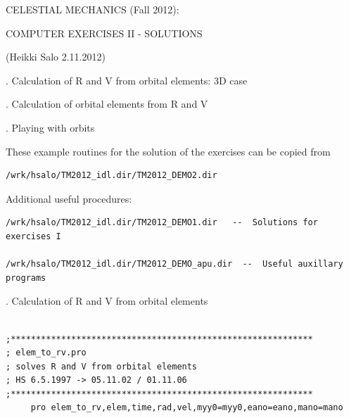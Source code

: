 \documentclass[a4paper,12pt]{article}
\def\red{\color{red}}
\def\black{\color{RGBblack}}
\begin{document}
{\centerline{}




{\norm
\vskip 0cm
{{\centerline { {\isob CELESTIAL MECHANICS (Fall 2012): }}}}
\vskip 0.2cm
{{\centerline { {\isob COMPUTER EXERCISES II - SOLUTIONS}}}}

{{\centerline { { (Heikki Salo 2.11.2012)}}}}

\vskip 2cm

{. Calculation of R and V from orbital elements: 3D case}

{. Calculation of orbital elements from R and V}

{. Playing with orbits}

\vskip 1cm



These example routines for the solution of the exercises can be copied from


\begin{verbatim}
/wrk/hsalo/TM2012_idl.dir/TM2012_DEMO2.dir
\end{verbatim}

Additional useful procedures:

\begin{verbatim}
/wrk/hsalo/TM2012_idl.dir/TM2012_DEMO1.dir   --  Solutions for exercises I

/wrk/hsalo/TM2012_idl.dir/TM2012_DEMO_apu.dir  --  Useful auxillary programs

\end{verbatim}
\newpage

\black

{. Calculation of R and V from orbital elements} 


{\red \scriptsize
\begin{verbatim}

;************************************************************
; elem_to_rv.pro
; solves R and V from orbital elements
; HS 6.5.1997 -> 05.11.02 / 01.11.06
;************************************************************
     pro elem_to_rv,elem,time,rad,vel,myy0=myy0,eano=eano,mano=mano


\end{verbatim}}}}
\end{document}
